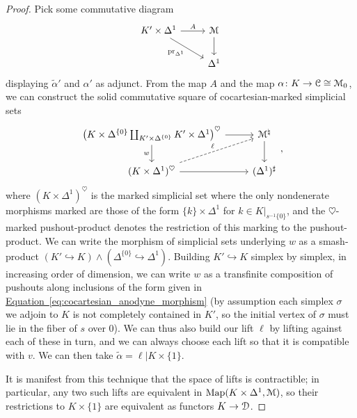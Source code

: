 \documentclass[main.tex]{subfiles}
\begin{document}
\begin{proof}
  Pick some commutative diagram
  \begin{equation*}
    \begin{tikzcd}
      K' \times \Delta^{1}
      \arrow[r, "A"]
      \arrow[dr, swap, "\pr_{\Delta^{1}}"]
      & \category{M}
      \arrow[d]
      \\
      & \Delta^{1}
    \end{tikzcd}
  \end{equation*}
  displaying $\tilde{\alpha}'$ and $\alpha'$ as adjunct. From the map $A$ and the map $\alpha\colon K \to \mathcal{C} \cong \mathcal{M}_{0}$, we can construct the solid commutative square of cocartesian-marked simplicial sets
  \begin{equation*}
    \begin{tikzcd}
      \left(K \times \Delta^{\{0\}} \coprod_{K' \times \Delta^{\{0\}}} K' \times \Delta^{1}\right)^{\heartsuit}
      \arrow[r]
      \arrow[d, swap, "w"]
      & \category{M}^{\natural}
      \arrow[d]
      \\
      (K \times \Delta^{1})^{\heartsuit}
      \arrow[ur, dashed, "\ell"]
      \arrow[r]
      & (\Delta^{1})^{\sharp}
    \end{tikzcd},
  \end{equation*}
  where $(K \times \Delta^{1})^{\heartsuit}$ is the marked simplicial set where the only nondenerate morphisms marked are those of the form $\{k\} \times \Delta^{1}$ for $k \in K|_{s^{-1}\{0\}}$, and the $\heartsuit$-marked pushout-product denotes the restriction of this marking to the pushout-product. We can write the morphism of simplicial sets underlying $w$ as a smash-product $(K' \hookrightarrow K) \wedge (\Delta^{\{0\}} \hookrightarrow \Delta^{1})$. Building $K' \hookrightarrow K$ simplex by simplex, in increasing order of dimension, we can write $w$ as a transfinite composition of pushouts along inclusions of the form given in \hyperref[eq:cocartesian_anodyne_morphism]{Equation~\ref*{eq:cocartesian_anodyne_morphism}} (by assumption each simplex $\sigma$ we adjoin to $K$ is not completely contained in $K'$, so the initial vertex of $\sigma$ must lie in the fiber of $s$ over $0$). We can thus also build our lift $\ell$ by lifting against each of these in turn, and we can always choose each lift so that it is compatible with $v$. We can then take $\tilde{\alpha} = \ell|K \times \{1\}$.

  It is manifest from this technique that the space of lifts is contractible; in particular, any two such lifts are equivalent in $\mathrm{Map}(K \times \Delta^{1}, \mathcal{M})$, so their restrictions to $K \times \{1\}$ are equivalent as functors $K \to \mathcal{D}$.


\end{proof}
\end{document}
